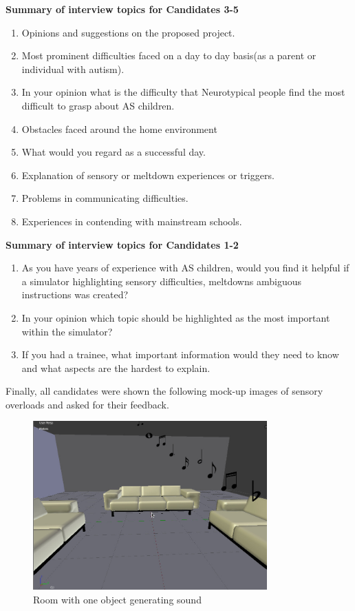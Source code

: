 \textbf{Summary of interview topics for Candidates 3-5}
\begin{enumerate}
\item Opinions and suggestions on the proposed project.
\item Most prominent difficulties faced on a day to day basis(as a parent or individual with autism).
\item In your opinion what is the difficulty that Neurotypical people find the most difficult to grasp about AS children.
\item Obstacles faced around the home environment
\item What would you regard as a successful day.
\item Explanation of sensory or meltdown experiences or triggers.
\item Problems in communicating difficulties.
\item Experiences in contending with mainstream schools.
\end{enumerate}

\textbf{Summary of interview topics for Candidates 1-2}
\begin{enumerate}
\item As you have years of experience with AS children, would you find it helpful if a simulator highlighting sensory difficulties, meltdowns ambiguous instructions was created?
\item In your opinion which topic should be highlighted as the most important within the simulator? 
\item If you had a trainee, what important information would they need to know and what aspects are the hardest to explain.
\end{enumerate}

Finally, all candidates were shown the following mock-up images of sensory overloads and asked for their feedback. 

\begin{figure}[H]
\centering
\includegraphics[width=90mm]{images/design/GD_basic.jpg}
\caption{Room with one object generating sound}
\label{sensorymockup1}
\end{figure}


